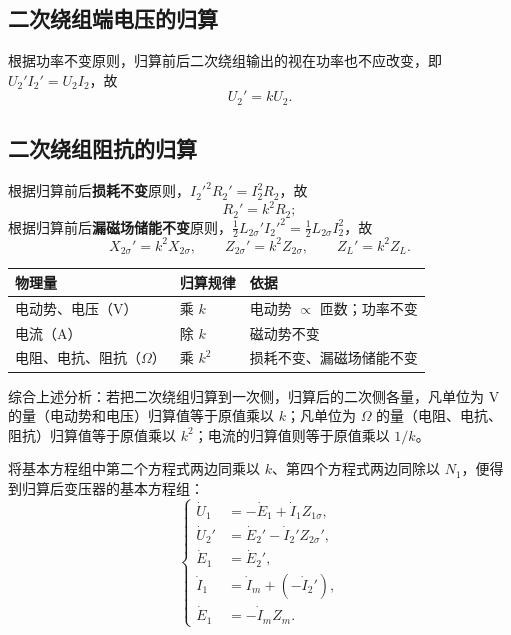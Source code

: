 \subsection{二次绕组端电压的归算}
根据功率不变原则，归算前后二次绕组输出的视在功率也不应改变，即 $U_2'I_2'=U_2I_2$，故
\begin{equation}
U_2'=kU_2 .
\end{equation}

\subsection{二次绕组阻抗的归算}
根据归算前后\textbf{损耗不变}原则，$I_2'^2R_2'=I_2^2R_2$，故
\begin{equation}
R_2'=k^{2}R_2 ;
\end{equation}
根据归算前后\textbf{漏磁场储能不变}原则，$\tfrac12L_{2\sigma}'I_2'^2=\tfrac12L_{2\sigma}I_2^2$，故
\begin{equation}
X_{2\sigma}'=k^{2}X_{2\sigma},\qquad Z_{2\sigma}'=k^{2}Z_{2\sigma},\qquad Z_L'=k^{2}Z_L .
\end{equation}

\begin{center}
\begin{tabular}{@{}lll@{}}
\toprule
物理量 & 归算规律 & 依据 \\
\midrule
电动势、电压（V） & 乘 $k$ & 电动势 $\propto$ 匝数；功率不变 \\
电流（A） & 除 $k$ & 磁动势不变 \\
电阻、电抗、阻抗（$\Omega$） & 乘 $k^{2}$ & 损耗不变、漏磁场储能不变 \\
\bottomrule
\end{tabular}
\end{center}

综合上述分析：若把二次绕组归算到一次侧，归算后的二次侧各量，凡单位为 V 的量（电动势和电压）归算值等于原值乘以 $k$；凡单位为 $\Omega$ 的量（电阻、电抗、阻抗）归算值等于原值乘以 $k^2$；电流的归算值则等于原值乘以 $1/k$。

将基本方程组中第二个方程式两边同乘以 $k$、第四个方程式两边同除以 $N_1$，便得到归算后变压器的基本方程组：
\begin{equation}
\left\{
\begin{aligned}
\dot U_1&=-\dot E_1+\dot I_1Z_{1\sigma},\\
\dot U_2'&=\dot E_2'-\dot I_2'Z_{2\sigma}',\\
\dot E_1&=\dot E_2',\\
\dot I_1&=\dot I_m+\left(-\dot I_2'\right),\\
\dot E_1&=-\dot I_mZ_m .
\end{aligned}
\right.
\end{equation}

